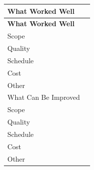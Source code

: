 \documentclass[10pt,letterpaper]{article}
\renewcommand\arraystretch{1.25}
\begin{document}
\begin{center}
\begingroup
\setlength\tabcolsep{2.0pt}
\footnotesize
\renewcommand\arraystretch{1.55}
\begin{longtable}{|>{\raggedright\arraybackslash}p{3.245in}|>{\raggedright\arraybackslash}p{3.245in}|}
\hline
\rowcolor{light}
\textbf{What Worked Well} & \rule{0pt}{11pt}\hspace{0pt} \\ \hline
\endfirsthead
\hline\rowcolor{light} \textbf{What Worked Well} & \rule{0pt}{11pt}\hspace{0pt} \\ \hline
\endhead
Scope & \rule{0pt}{11pt}\hspace{0pt} \\ \hline
Quality & \rule{0pt}{11pt}\hspace{0pt} \\ \hline
Schedule & \rule{0pt}{11pt}\hspace{0pt} \\ \hline
Cost & \rule{0pt}{11pt}\hspace{0pt} \\ \hline
Other & \rule{0pt}{11pt}\hspace{0pt} \\ \hline
What Can Be Improved & \rule{0pt}{11pt}\hspace{0pt} \\ \hline
Scope & \rule{0pt}{11pt}\hspace{0pt} \\ \hline
Quality & \rule{0pt}{11pt}\hspace{0pt} \\ \hline
Schedule & \rule{0pt}{11pt}\hspace{0pt} \\ \hline
Cost & \rule{0pt}{11pt}\hspace{0pt} \\ \hline
Other & \rule{0pt}{11pt}\hspace{0pt} \\ \hline
\end{longtable}
\endgroup
\end{center}
\end{document}
